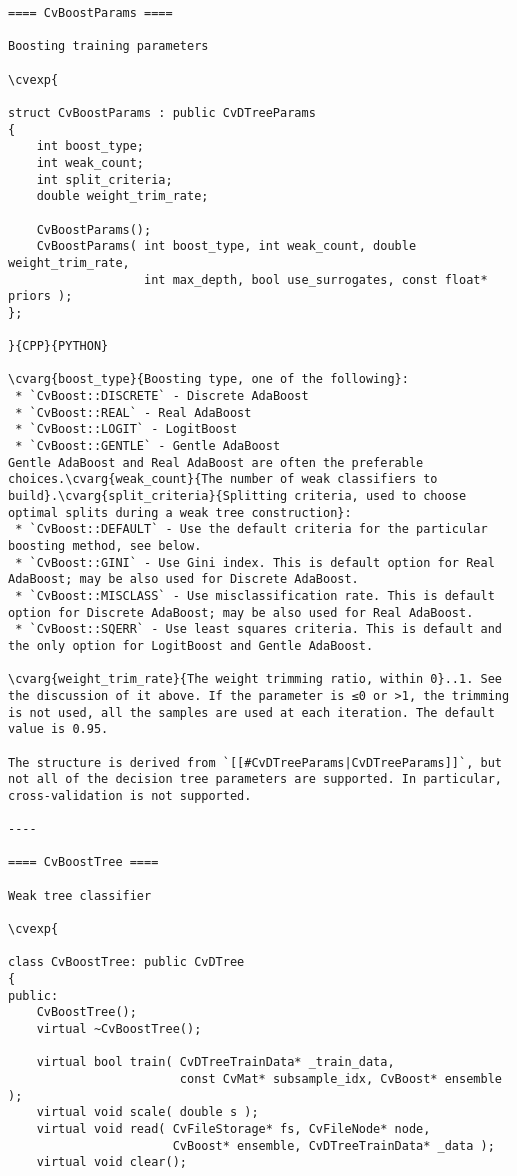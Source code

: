 \begin{verbatim}
==== CvBoostParams ====

Boosting training parameters

\cvexp{

struct CvBoostParams : public CvDTreeParams
{
    int boost_type;
    int weak_count;
    int split_criteria;
    double weight_trim_rate;

    CvBoostParams();
    CvBoostParams( int boost_type, int weak_count, double weight_trim_rate,
                   int max_depth, bool use_surrogates, const float* priors );
};

}{CPP}{PYTHON}

\cvarg{boost_type}{Boosting type, one of the following}:
 * `CvBoost::DISCRETE` - Discrete AdaBoost
 * `CvBoost::REAL` - Real AdaBoost
 * `CvBoost::LOGIT` - LogitBoost
 * `CvBoost::GENTLE` - Gentle AdaBoost
Gentle AdaBoost and Real AdaBoost are often the preferable choices.\cvarg{weak_count}{The number of weak classifiers to build}.\cvarg{split_criteria}{Splitting criteria, used to choose optimal splits during a weak tree construction}:
 * `CvBoost::DEFAULT` - Use the default criteria for the particular boosting method, see below.
 * `CvBoost::GINI` - Use Gini index. This is default option for Real AdaBoost; may be also used for Discrete AdaBoost.
 * `CvBoost::MISCLASS` - Use misclassification rate. This is default option for Discrete AdaBoost; may be also used for Real AdaBoost.
 * `CvBoost::SQERR` - Use least squares criteria. This is default and the only option for LogitBoost and Gentle AdaBoost.

\cvarg{weight_trim_rate}{The weight trimming ratio, within 0}..1. See the discussion of it above. If the parameter is ≤0 or >1, the trimming is not used, all the samples are used at each iteration. The default value is 0.95.

The structure is derived from `[[#CvDTreeParams|CvDTreeParams]]`, but not all of the decision tree parameters are supported. In particular, cross-validation is not supported.

----

==== CvBoostTree ====

Weak tree classifier

\cvexp{

class CvBoostTree: public CvDTree
{
public:
    CvBoostTree();
    virtual ~CvBoostTree();

    virtual bool train( CvDTreeTrainData* _train_data,
                        const CvMat* subsample_idx, CvBoost* ensemble );
    virtual void scale( double s );
    virtual void read( CvFileStorage* fs, CvFileNode* node,
                       CvBoost* ensemble, CvDTreeTrainData* _data );
    virtual void clear();


\end{verbatim}
